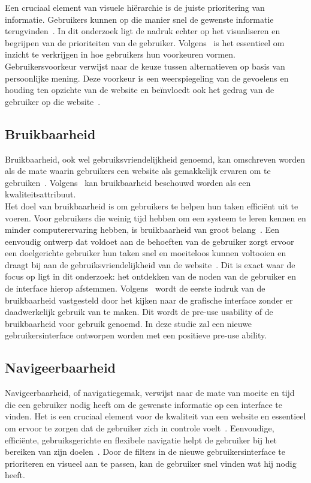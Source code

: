 Een cruciaal element van visuele hiërarchie is de juiste prioritering van informatie. Gebruikers kunnen op die manier snel de gewenste informatie terugvinden~\autocite{Raghavendra2024}. In dit onderzoek ligt de nadruk echter op het visualiseren en begrijpen van de prioriteiten van de gebruiker. Volgens~\textcite{Lee2010} is het essentieel om inzicht te verkrijgen in hoe gebruikers hun voorkeuren vormen. Gebruikersvoorkeur verwijst naar de keuze tussen alternatieven op basis van persoonlijke mening. Deze voorkeur is een weerspiegeling van de gevoelens en houding ten opzichte van de website en beïnvloedt ook het gedrag van de gebruiker op die website~\autocite{Lee2010}.

\subsection{Bruikbaarheid}
Bruikbaarheid, ook wel gebruiksvriendelijkhe\-id genoemd, kan omschreven worden als de mate waarin gebruikers een website als gemakkelijk ervaren om te gebruiken~\autocite{Dianat2019}. Volgens~\textcite{Dingli2014} kan bruikbaarheid beschouwd worden als een kwaliteitsattribuut.\\Het doel van bruikbaarheid is om gebruikers te helpen hun taken efficiënt uit te voeren. Voor gebruikers die weinig tijd hebben om een systeem te leren kennen en minder computerervaring hebben, is bruikbaarheid van groot belang~\autocite{Mazumder2014}. Een eenvoudig ontwerp dat voldoet aan de behoeften van de gebruiker zorgt ervoor een doelgerichte gebruiker hun taken snel en moeiteloos kunnen voltooien en draagt bij aan de gebruiksvriendelijkheid van de website~\autocite{Pearson2007}. Dit is exact waar de focus op ligt in dit onderzoek: het ontdekken van de noden van de gebruiker en de interface hierop afstemmen. Volgens~\textcite{Zachrison2022} wordt de eerste indruk van de bruikbaarheid vastgesteld door het kijken naar de grafische interface zonder er daadwerkelijk gebruik van te maken. Dit wordt de pre-use usability of de bruikbaarheid voor gebruik genoemd. In deze studie zal een nieuwe gebruikersinterface ontworpen worden met een positieve pre-use ability.

\subsection{Navigeerbaarheid}
Navigeerbaarheid, of navigatiegemak, verwijst naar de mate van moeite en tijd die een gebruiker nodig heeft om de gewenste informatie op een interface te vinden. Het is een cruciaal element voor de kwaliteit van een website en essentieel om ervoor te zorgen dat de gebruiker zich in controle voelt~\autocite{Zachrison2022}. Eenvoudige, efficiënte, gebruiksgerichte en flexibele navigatie helpt de gebruiker bij het bereiken van zijn doelen~\autocite{Pearson2007}. Door de filters in de nieuwe gebruikersinterface te prioriteren en visueel aan te passen, kan de gebruiker snel vinden wat hij nodig heeft.

